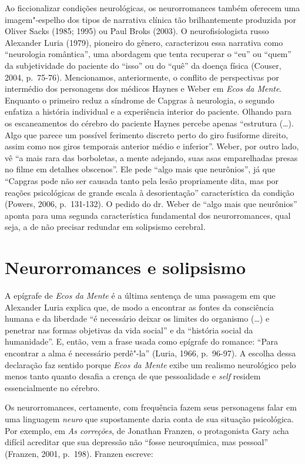 Ao ficcionalizar condições neurológicas, os neurorromances também
oferecem uma imagem"-espelho dos tipos de narrativa clínica tão
brilhantemente produzida por Oliver Sacks (1985; 1995) ou Paul Broks
(2003). O neurofisiologista russo Alexander Luria (1979), pioneiro do
gênero, caracterizou essa narrativa como ``neurologia romântica'', uma
abordagem que tenta recuperar o ``eu'' ou ``quem'' da subjetividade do
paciente do ``isso'' ou do ``quê'' da doença física (Couser, 2004,
p.~75-76). Mencionamos, anteriormente, o conflito de perspectivas por
intermédio dos personagens dos médicos Haynes e Weber em \emph{Ecos da
Mente}. Enquanto o primeiro reduz a síndrome de Capgras à neurologia, o
segundo enfatiza a história individual e a experiência interior do
paciente. Olhando para os escaneamentos do cérebro do paciente Haynes
percebe apenas ``estrutura (\ldots{}). Algo que parece um possível ferimento
discreto perto do giro fusiforme direito, assim como nos giros temporais
anterior médio e inferior''. Weber, por outro lado, vê ``a mais rara das
borboletas, a mente adejando, suas asas emparelhadas presas no filme em
detalhes obscenos''. Ele pede ``algo mais que neurônios'', já que
``Capgras pode não ser causada tanto pela lesão propriamente dita, mas
por reações psicológicas de grande escala à desorientação''
característica da condição (Powers, 2006, p.~131-132). O pedido do dr.
Weber de ``algo mais que neurônios'' aponta para uma segunda
característica fundamental dos neurorromances, qual seja, a de não
precisar redundar em solipsismo cerebral.

\section{Neurorromances e solipsismo}

A epígrafe de \emph{Ecos da Mente} é a última sentença de uma passagem
em que Alexander Luria explica que, de modo a encontrar as fontes da
consciência humana e da liberdade ``é necessário deixar os limites do
organismo (\ldots{}) e penetrar nas formas objetivas da vida social'' e da
``história social da humanidade''. E, então, vem a frase usada como
epígrafe do romance: ``Para encontrar a alma é necessário perdê"-la''
(Luria, 1966, p.~96-97). A escolha dessa declaração faz sentido porque
\emph{Ecos da Mente} exibe um realismo neurológico pelo menos tanto quanto desafia a crença de que pessoalidade e \emph{self} residem essencialmente no cérebro.

Os neurorromances, certamente, com frequência fazem seus personagens
falar em uma linguagem \emph{neuro} que supostamente daria conta de sua
situação psicológica. Por exemplo, em \emph{As correções}, de Jonathan
Franzen, o protagonista Gary acha difícil acreditar que sua depressão
não ``fosse neuroquímica, mas pessoal'' (Franzen, 2001, p.~198). Franzen
escreve:

